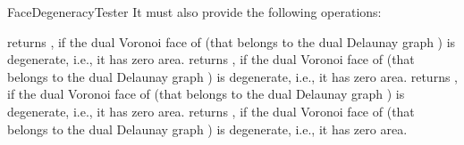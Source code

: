 \begin{ccRefFunctionObjectConcept}{FaceDegeneracyTester}
\ccOperations
It must also provide the following operations:

\ccThreeToTwo
{}
{returns , if the dual Voronoi face of  (that
  belongs to the dual Delaunay graph ) is
  degenerate, i.e., it has zero area.}
%
\ccGlue
{}
{returns , if the dual Voronoi face of  (that
  belongs to the dual Delaunay graph ) is
  degenerate, i.e., it has zero area.}
%
\ccGlue
{}
{returns , if the dual Voronoi face of  (that
  belongs to the dual Delaunay graph ) is
  degenerate, i.e., it has zero area.}
%
\ccGlue
{}
{returns , if the dual Voronoi face of  (that
  belongs to the dual Delaunay graph ) is
  degenerate, i.e., it has zero area.}


\ccSeeAlso
{}

\end{ccRefFunctionObjectConcept}
